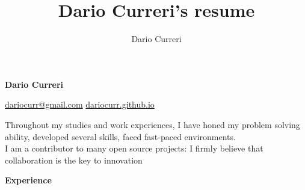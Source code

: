 \documentclass[11pt,letterpaper]{article}
\author{Dario Curreri}
\title{Dario Curreri's resume}
\begin{document}
\makeatletter
\def\Hy@colorlink#1{\begingroup\fontshape{it}\selectfont}%
\makeatother
\begin{justify}
      \begin{LARGE}
            \textbf{Dario Curreri}
      \end{LARGE}
      \hspace{0.5cm}
      \href{mailto:dariocurr@gmail.com}{dariocurr@gmail.com}
      \hspace{0.5cm}
      \href{https://dariocurr.github.io/}{dariocurr.github.io}
      \hfill
      \href{https://github.com/dariocurr/}{}
      \hspace{0.1cm}
      \href{https://www.linkedin.com/in/dariocurr}{}
      \hspace{0.1cm}
      \href{https://scholar.google.it/citations?user=DhJKkeMAAAAJ}{}
      \hspace{0.1cm}
      \href{https://dariocurr.medium.com/}{}

      Throughout my studies and work experiences, I have honed my problem solving ability, developed several skills, faced fast-paced environments.\\
      I am a contributor to many open source projects: I firmly believe that collaboration is the key to innovation

            {\large \textbf{Experience} \strut}


\end{justify}
\end{document}
